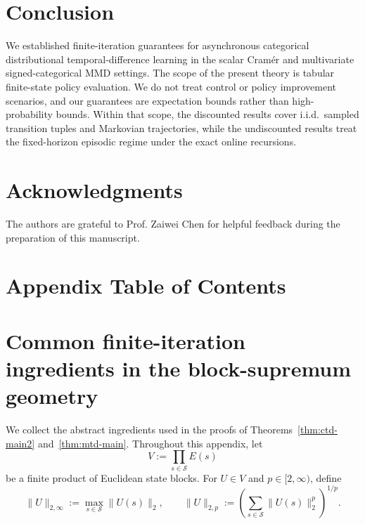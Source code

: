 \documentclass{article}
\newcommand{\X}{\mathcal{S}}
\begin{document}
\section{Conclusion}
We established finite-iteration guarantees for asynchronous categorical distributional temporal-difference learning in the scalar Cramér and multivariate signed-categorical MMD settings. The scope of the present theory is tabular finite-state policy evaluation. We do not treat control or policy improvement scenarios, and our guarantees are expectation bounds rather than high-probability bounds. Within that scope, the discounted results cover i.i.d.\ sampled transition tuples and Markovian trajectories, while the undiscounted results treat the fixed-horizon episodic regime under the exact online recursions.

\section*{Acknowledgments}

The authors are grateful to Prof. Zaiwei Chen for helpful feedback during the preparation of this manuscript.

\newpage


\newpage
\appendix
\section*{Appendix Table of Contents}
\startcontents[appendix]

\section{Common finite-iteration ingredients in the block-supremum geometry}
\label{app:common}

We collect the abstract ingredients \citep{robbins1951stochastic, ljung2003analysis, borkar2008stochastic, kushner2003stochastic} used in the proofs of Theorems~\ref{thm:ctd-main2} and~\ref{thm:mtd-main}. Throughout this appendix, let
\begin{equation}
V := \prod_{s\in \X} E(s)
\end{equation}
be a finite product of Euclidean state blocks. For $U\in V$ and $p\in[2,\infty)$, define
\begin{equation}
\lVert U \rVert_{2,\infty} := \max_{s\in \X}\lVert U(s) \rVert_2, \qquad \lVert U \rVert_{2,p} := \left(\sum_{s\in \X}\lVert U(s) \rVert_2^p\right)^{1/p}.
\end{equation}
\end{document}
